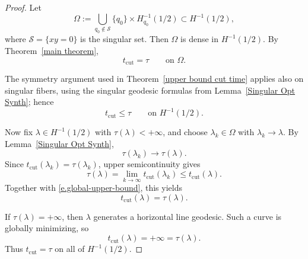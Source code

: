 \documentclass[12pt]{amsart}
\numberwithin{equation}{section}
\theoremstyle{plain}
\theoremstyle{definition}
\theoremstyle{remark}
\begin{document}
\begin{proof}
    Let
    \[
        \Omega
        :=
        \bigcup_{q_0\notin\mathcal S}
        \{q_0\}\times H_{q_0}^{-1}(1/2)
        \subset H^{-1}(1/2),
    \]
    where \(\mathcal S=\{xy=0\}\) is the singular set. Then \(\Omega\) is dense in
    \(H^{-1}(1/2)\). By Theorem~\ref{main theorem},
    \[
        t_{\operatorname{cut}}=\tau
        \qquad
        \text{on }\Omega.
    \]

    The symmetry argument used in Theorem~\ref{upper bound cut time} applies also on singular
    fibers, using the singular geodesic formulas from Lemma~\ref{Singular Opt Synth}; hence
    \begin{equation}\label{e.global-upper-bound}
        t_{\operatorname{cut}}\leq \tau
        \qquad
        \text{on }H^{-1}(1/2).
    \end{equation}

    Now fix \(\lambda\in H^{-1}(1/2)\) with \(\tau(\lambda)<+\infty\), and choose
    \(\lambda_k\in\Omega\) with \(\lambda_k\to\lambda\). By Lemma~\ref{Singular Opt Synth},
    \[
        \tau(\lambda_k)\to\tau(\lambda).
    \]
    Since \(t_{\operatorname{cut}}(\lambda_k)=\tau(\lambda_k)\), upper semicontinuity gives
    \[
        \tau(\lambda)
        =
        \lim_{k\to\infty}t_{\operatorname{cut}}(\lambda_k)
        \leq
        t_{\operatorname{cut}}(\lambda).
    \]
    Together with \eqref{e.global-upper-bound}, this yields
    \[
        t_{\operatorname{cut}}(\lambda)=\tau(\lambda).
    \]

    If \(\tau(\lambda)=+\infty\), then \(\lambda\) generates a horizontal line geodesic.
    Such a curve is globally minimizing, so
    \[
        t_{\operatorname{cut}}(\lambda)=+\infty=\tau(\lambda).
    \]
    Thus \(t_{\operatorname{cut}}=\tau\) on all of \(H^{-1}(1/2)\).
\end{proof}
\end{document}
